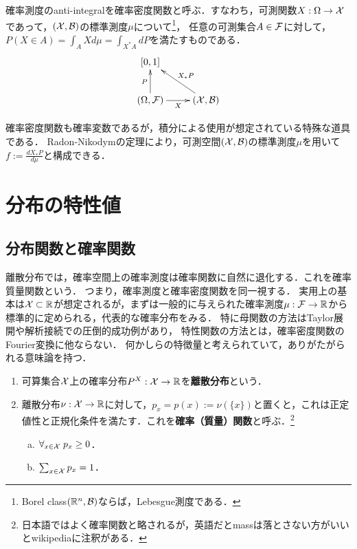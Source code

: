 \documentclass[uplatex,dvipdfmx]{jsreport}
\begin{document}
\begin{definition}[density]
    確率測度のanti-integralを確率密度関数と呼ぶ．すなわち，可測関数$X:\Omega\to\mathcal{X}$であって，$(\mathcal{X},\mathcal{B})$の標準測度$\mu$について\footnote{Borel class$(\mathbb{R}^n,\mathcal{B})$ならば，Lebesgue測度である．}，
    任意の可測集合$A\in\mathcal{F}$に対して，$P(X\in A)=\int_AXd\mu=\int_{X^*A}dP$を満たすものである．
    \[\xymatrix{
        {[0,1]}\\
        (\Omega,\calF)\ar[u]^-{P}\ar[r]_-X&(\X,\B)\ar[ul]_-{X_*P}
    }\]
\end{definition}
\begin{remarks}
    確率密度関数も確率変数であるが，積分による使用が想定されている特殊な道具である．
    Radon-Nikodymの定理により，可測空間$(\mathcal{X},\mathcal{B})$の標準測度$\mu$を用いて
    $f:=\frac{dX_*P}{d\mu}$と構成できる．
\end{remarks}

\section{分布の特性値}

\subsection{分布関数と確率関数}

\begin{tcolorbox}[colframe=ForestGreen, colback=ForestGreen!10!white,breakable,colbacktitle=ForestGreen!40!white,coltitle=black,fonttitle=\bfseries\sffamily,
    title=]
    離散分布では，確率空間上の確率測度は確率関数に自然に退化する．これを確率質量関数という．
    つまり，確率測度と確率密度関数を同一視する．
    実用上の基本は$\mathcal{X}\subset\mathbb{R}$が想定されるが，まずは一般的に与えられた確率測度$\mu:\mathcal{F}\to\mathbb{R}$から標準的に定められる，代表的な確率分布をみる．
    特に母関数の方法はTaylor展開や解析接続での圧倒的成功例があり，
    特性関数の方法とは，確率密度関数のFourier変換に他ならない．
    何かしらの特徴量と考えられていて，ありがたがられる意味論を持つ．
\end{tcolorbox}

\begin{definition}\mbox{}
    \begin{enumerate}
        \item 可算集合$\mathcal{X}$上の確率分布$P^X:\mathcal{X}\to\mathbb{R}$を\textbf{離散分布}という．
        \item 離散分布$\nu:\mathcal{X}\to\mathbb{R}$に対して，$p_x=p(x):=\nu(\{x\})$と置くと，これは正定値性と正規化条件を満たす．これを\textbf{確率（質量）関数}と呼ぶ．\footnote{日本語ではよく確率関数と略されるが，英語だとmassは落とさない方がいいとwikipediaに注釈がある．}
        \begin{enumerate}[(a)]
            \item $\forall_{x\in\mathcal{X}}\;p_x\ge 0$．
            \item $\sum_{x\in\mathcal{X}}p_x=1$．
        \end{enumerate}
    \end{enumerate}
\end{definition}
\end{document}
